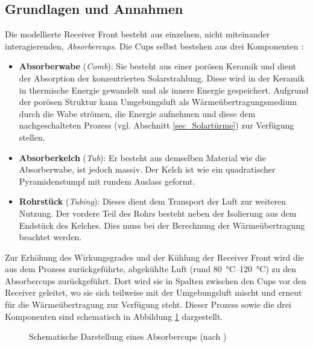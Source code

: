 \subsection{Grundlagen und Annahmen} \label{subsec_GrundlagenAnnahmen}
Die modellierte Receiver Front besteht aus einzelnen, nicht miteinander interagierenden, \textit{Absorbercups}.
Die Cups selbst bestehen aus drei Komponenten \cite[S.91]{DissGall}:
\begin{itemize}
\item \textbf{Absorberwabe} (\textit{Comb}): Sie besteht aus einer porösen Keramik und dient der Absorption der konzentrierten Solarstrahlung.
Diese wird in der Keramik in thermische Energie gewandelt und als innere Energie gespeichert.
Aufgrund der porösen Struktur kann Umgebungsluft als Wärmeübertragungsmedium durch die Wabe strömen, die Energie aufnehmen und diese dem nachgeschalteten Prozess (vgl. Abschnitt \ref{sec_Solartürme}) zur Verfügung stellen.
\item \textbf{Absorberkelch} (\textit{Tub}): Er besteht aus demselben Material wie die Absorberwabe, ist jedoch massiv.
Der Kelch ist wie ein quadratischer Pyramidenstumpf mit rundem Auslass geformt.
\item \textbf{Rohrstück} (\textit{Tubing}): Dieses dient dem Transport der Luft zur weiteren Nutzung. Der vordere Teil des Rohrs besteht neben der Isolierung aus dem Endstück des Kelches.
          Dies muss bei der Berechnung der Wärmeübertragung beachtet werden.
\end{itemize}

Zur Erhöhung des Wirkungsgrades und der Kühlung der Receiver Front wird die aus dem Prozess zurückgeführte, abgekühlte Luft (rund \SIrange{80}{120}{\degreeCelsius}) \cite{IdingSolarPaces} zu den Absorbercups zurückgeführt.
Dort wird sie in Spalten zwischen den Cups vor den Receiver geleitet, wo sie sich teilweise mit der Umgebungsluft mischt und erneut für die Wärmeübertragung zur Verfügung steht.
Dieser Prozess sowie die drei Komponenten sind schematisch in Abbildung \ref{fig_AufbauCup} dargestellt.

\begin{figure}[h!]
    \centering
    \setlength{\fboxsep}{1pt}
    \setlength{\fboxrule}{1pt}
    \caption[Schematische Darstellung eines Absorbercups]{Schematische Darstellung eines Absorbercups (nach \cite[S.90]{DissGall})}
    \label{fig_AufbauCup}
\end{figure}


